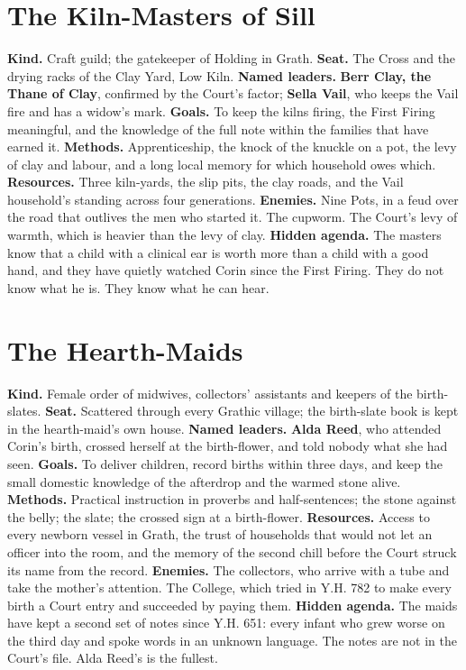 \documentclass{design/chronicle}
\begin{document}
\section*{The Kiln-Masters of Sill}

\textbf{Kind.} Craft guild; the gatekeeper of Holding in Grath. \textbf{Seat.} The Cross and the drying racks of the Clay Yard, Low Kiln. \textbf{Named leaders.} \textbf{Berr Clay, the Thane of Clay}, confirmed by the Court’s factor; \textbf{Sella Vail}, who keeps the Vail fire and has a widow’s mark. \textbf{Goals.} To keep the kilns firing, the First Firing meaningful, and the knowledge of the full note within the families that have earned it. \textbf{Methods.} Apprenticeship, the knock of the knuckle on a pot, the levy of clay and labour, and a long local memory for which household owes which. \textbf{Resources.} Three kiln-yards, the slip pits, the clay roads, and the Vail household’s standing across four generations. \textbf{Enemies.} Nine Pots, in a feud over the road that outlives the men who started it. The cupworm. The Court’s levy of warmth, which is heavier than the levy of clay. \textbf{Hidden agenda.} The masters know that a child with a clinical ear is worth more than a child with a good hand, and they have quietly watched Corin since the First Firing. They do not know what he is. They know what he can hear.

\section*{The Hearth-Maids}

\textbf{Kind.} Female order of midwives, collectors’ assistants and keepers of the birth-slates. \textbf{Seat.} Scattered through every Grathic village; the birth-slate book is kept in the hearth-maid’s own house. \textbf{Named leaders.} \textbf{Alda Reed}, who attended Corin’s birth, crossed herself at the birth-flower, and told nobody what she had seen. \textbf{Goals.} To deliver children, record births within three days, and keep the small domestic knowledge of the afterdrop and the warmed stone alive. \textbf{Methods.} Practical instruction in proverbs and half-sentences; the stone against the belly; the slate; the crossed sign at a birth-flower. \textbf{Resources.} Access to every newborn vessel in Grath, the trust of households that would not let an officer into the room, and the memory of the second chill before the Court struck its name from the record. \textbf{Enemies.} The collectors, who arrive with a tube and take the mother’s attention. The College, which tried in Y.H. 782 to make every birth a Court entry and succeeded by paying them. \textbf{Hidden agenda.} The maids have kept a second set of notes since Y.H. 651: every infant who grew worse on the third day and spoke words in an unknown language. The notes are not in the Court’s file. Alda Reed’s is the fullest.
\end{document}
